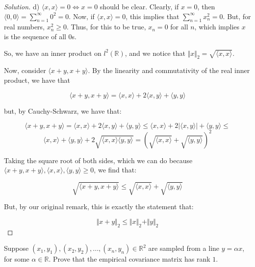 \documentclass[10pt]{article}
\newenvironment{problem}[2][]{\begin{trivlist}
\item[\hskip \labelsep {\bfseries #1}\hskip \labelsep {\bfseries #2.}]}{\end{trivlist}}
\begin{document}
\begin{proof}[Solution]
d) $\langle x,x \rangle = 0 \iff x = 0$ should be clear. Clearly, if $x = 0$, then $\langle 0, 0 \rangle = \sum_{n=1}^\infty 0^2 = 0$. Now, if $\langle x, x \rangle = 0$, this implies that $\sum_{n=1}^\infty x_n^2 = 0$. But, for real numbers, $x_n^2 \geq 0$. Thus, for this to be true, $x_n = 0$ for all $n$, which implies $x$ is the sequence of all 0s.

So, we have an inner product on $l^2(\mathbb{R})$, and we notice that $\Vert x \Vert_2 = \sqrt{ \langle x,x \rangle}$.

Now, consider $\langle x + y, x+y \rangle$. By the linearity and commutativity of the real inner product, we have that

$$ \langle x + y , x + y \rangle = \langle x, x \rangle + 2 \langle x, y\rangle + \langle y,y \rangle $$

but, by Cauchy-Schwarz, we have that:

$$  \langle x + y , x + y \rangle = \langle x, x \rangle + 2 \langle x, y \rangle + \langle y,y \rangle \leq \langle x, x \rangle + 2 |\langle x, y\rangle| + \langle y,y \rangle \leq $$
$$ \langle x,x \rangle + \langle y,y\rangle + 2\sqrt{ \langle x,x\rangle \langle y,y \rangle} = \left(\sqrt{\langle x,x\rangle } + \sqrt{\langle y,y \rangle}\right)^2 $$

Taking the square root of both sides, which we can do because $\langle x +y, x+y \rangle,  \langle x,x \rangle,  \langle y,y\rangle \geq 0$, we find that:

$$ \sqrt{ \langle x + y , x + y \rangle} \leq \sqrt{\langle x,x\rangle } + \sqrt{\langle y,y \rangle}$$

But, by our original remark, this is exactly the statement that:

$$ \Vert x+y \Vert_2 \leq \Vert x \Vert_2 + \Vert y \Vert_2 $$
\end{proof}

\begin{problem}{Question 4}

Suppose $(x_1, y_1), (x_2,y_2),...,(x_n,y_n) \in \mathbb{R}^2$ are sampled from a line $y = \alpha x$, for some $\alpha \in \mathbb{R}$. Prove that the empirical covariance matrix has rank $1$.

\end{problem}
\end{document}
